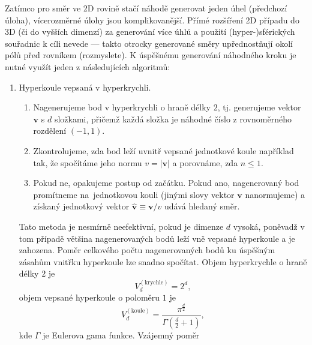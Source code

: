 \documentclass[a4paper,11pt,twoside]{article}
\def\vector#1{\boldsymbol{#1}}								%
\def\abs#1{\left|#1\right|}
\theoremstyle{red}
\theoremstyle{green}
\begin{document}
    \begin{solution}
        Zatímco pro směr ve 2D rovině stačí náhodě generovat jeden úhel (předchozí úloha), vícerozměrné úlohy jsou komplikovanější.
        Přímé rozšíření 2D případu do 3D (či do vyšších dimenzí) za generování více úhlů a použití (hyper-)sférických souřadnic k cíli nevede --- takto otrocky generované směry upřednostňují okolí pólů před rovníkem (rozmyslete).
        K úspěšnému generování náhodného kroku je nutné využít jeden z následujících algoritmů:
        \begin{enumerate}
            \item Hyperkoule vepsaná v hyperkrychli.
                \begin{enumerate}
                    \item Nagenerujeme bod v hyperkrychli o hraně délky $2$, tj. generujeme vektor $\vector{v}$ s $d$ složkami, přičemž každá složka je náhodné číslo z rovnoměrného rozdělení $(-1,1)$.
                    \item Zkontrolujeme, zda bod leží uvnitř vepsané jednotkové koule například tak, že spočítáme jeho normu $v=\abs{\vector{v}}$ a porovnáme, zda $n\leq1$.
                    \item Pokud ne, opakujeme postup od začátku.
                        Pokud ano, nagenerovaný bod promítneme na~jednotkovou kouli (jinými slovy vektor $\vector{v}$ nanormujeme) a získaný jednotkový vektor $\vector{\hat{v}}\equiv\vector{v}/v$ udává hledaný směr. 
                \end{enumerate}
                Tato metoda je nesmírně neefektivní, pokud je dimenze $d$ vysoká, poněvadž v tom případě většina nagenerovaných bodů leží vně vepsané hyperkoule a je zahozena.
                Poměr celkového počtu nagenerovaných bodů ku úspěšným zásahům vnitřku hyperkoule lze snadno spočítat.
                Objem hyperkrychle o hraně délky $2$ je
                \begin{equation}
                    V_{d}^{(\text{krychle})}=2^{d},
                \end{equation}
                objem vepsané hyperkoule o poloměru $1$ je
                \begin{equation}
                    V_{d}^{(\text{koule})}=\frac{\pi^{\frac{d}{2}}}{\Gamma\left(\frac{d}{2}+1\right)},
                \end{equation}
                kde $\Gamma$ je Eulerova gama funkce.
                Vzájemný poměr
                \begin{equation}

\end{equation}
\end{enumerate}
\end{solution}
\end{document}
